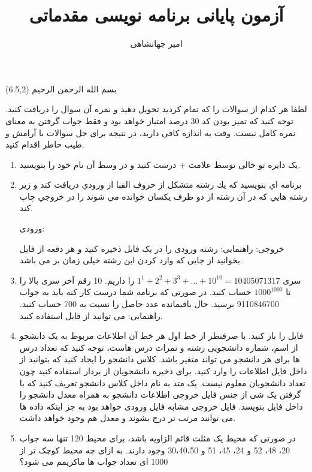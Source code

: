 \documentclass[oneside]{article}
\title{آزمون پایانی برنامه نویسی مقدماتی}
\author{امیر جهانشاهی}
\begin{document}
\maketitle

\begin{textblock}{5}(6.5,2)\nastaliqfont
\noindent\Large
بسم الله الرحمن الرحیم
\end{textblock}

\begin{tcolorbox}
لطفا هر کدام از سوالات را که تمام کردید تحویل دهید و نمره آن سوال را دریافت کنید. توجه کنید که تمیز بودن کد 30 درصد امتیاز خواهد بود و فقط جواب گرفتن به معنای نمره کامل نیست. وقت به اندازه کافی دارید، در نتیجه برای حل سوالات با آرامش و طیب خاطر اقدام کنید.
\end{tcolorbox}

\begin{enumerate}
\item
یک دایره تو خالی توسط علامت + درست کنید و در وسط آن نام خود را بنویسید.


\item
	برنامه اي بنويسيد كه يك رشته متشكل از حروف الفبا از ورودي دريافت كند و زير رشته هايي كه در آن رشته از دو طرف يكسان خوانده مي شوند را در خروجي چاپ كند.
	
	ورودی: 

خروجی: 
راهنمایی: رشته ورودی را در یک فایل ذخیره کنید و هر دفعه از فایل بخوانید از جایی که وارد کردن این رشته خیلی زمان بر می باشد.


\item
سری 
{$1^1+2^2+3^3+\ldots+10^{10}=10405071317$}
را داریم. 10 رقم آخر سری بالا را تا
$1000^{1000}$
حساب کنید. در صورتی که برنامه شما درست کار کنه باید به جواب 9110846700 برسید. حال باقیمانده عدد حاصل را نسبت به 700 حساب کنید.
راهنمایی: می توانید از فایل 
استفاده کنید.

\item
فایل 
را باز کنید. با صرفنظر از خط اول هر خط آن اطلاعات مربوط به یک دانشجو از اسم، شماره دانشجویی رشته و نمرات درس هاست، توجه کنید که تعداد درس ها برای هر دانشجو می تواند متغیر باشد. کلاس دانشجو را ایجاد کنید که بتوانید از داخل فایل اطلاعات را وارد کنید. برای ذخیره دانشجویان از بردار استفاده کنید چون تعداد دانشجویان معلوم نیست. یک متد به نام
داخل کلاس دانشجو تعریف کنید که با گرفتن یک شی از جنس فایل خروجی اطلاعات دانشجو به همراه معدل دانشجو را داخل فایل بنویسد. فایل خروجی مشابه فایل ورودی خواهد بود به جز اینکه داده ها می توانند مرتب تر درج بشوند و معدل هم وجود خواهد داشت.

\item
در صورتی که 
محیط یک مثلث قائم الزاویه باشد، برای محیط 120 تنها سه جواب 20، 48، 52 و 24، 45، 51 و 30،40،50 وجود دارند. به ازای چه محیط کوچک تر از 1000 ای تعداد جواب ها ماکزیمم می شود؟

\end{enumerate}
\end{document}

